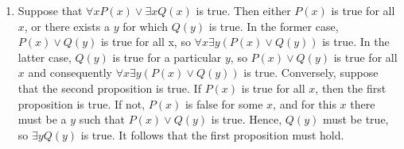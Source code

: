 \documentclass{../../cls/sig-alternate-05-2015}
\begin{document}
\begin{enumerate}
\item Suppose that $\forall x P(x) \vee \exists x Q(x)$ is
true. Then either $P(x)$ is true for all $x$, or there exists a $y$ for
which $Q(y)$ is true. In the former case, $P(x) \vee Q(y)$ is true
for all x, so $\forall x \exists y (P(x) \vee Q(y))$ is true. In the latter case,
$Q(y)$ is true for a particular $y$, so $P(x) \vee Q(y)$ is true for all
$x$ and consequently $\forall x \exists y(P(x) \vee Q(y))$ is true. Conversely,
suppose that the second proposition is true. If $P(x)$ is true for
all $x$, then the first proposition is true. If not, $P(x)$ is false for
some $x$, and for this $x$ there must be a $y$ such that $P(x) \vee Q(y)$
is true. Hence, $Q(y)$ must be true, so $\exists y Q(y)$ is true. It follows
that the first proposition must hold.
\end{enumerate}
\end{document}
